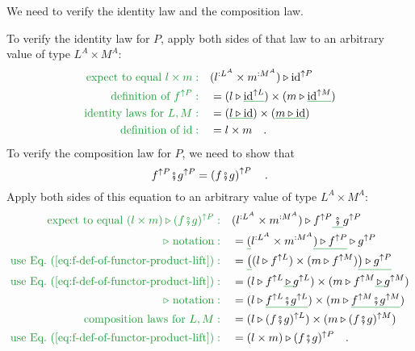 We need to verify the identity law and the composition law.

To verify the identity law for $P$, apply both sides of that law
to an arbitrary value of type $L^{A}\times M^{A}$:
\begin{align*}
{\color{greenunder}\text{expect to equal }l\times m:}\quad & (l^{:L^{A}}\times m^{:M^{A}})\triangleright\text{id}^{\uparrow P}\\
{\color{greenunder}\text{definition of }f^{\uparrow P}:}\quad & =(l\triangleright\gunderline{\text{id}^{\uparrow L}})\times(m\triangleright\gunderline{\text{id}^{\uparrow M}})\\
{\color{greenunder}\text{identity laws for }L,M:}\quad & =(\gunderline{l\triangleright\text{id}})\times(\gunderline{m\triangleright\text{id}})\\
{\color{greenunder}\text{definition of }\text{id}:}\quad & =l\times m\quad.
\end{align*}
To verify the composition law for $P$, we need to show that
\[
f^{\uparrow P}\bef g^{\uparrow P}=\left(f\bef g\right)^{\uparrow P}\quad.
\]
Apply both sides of this equation to an arbitrary value of type $L^{A}\times M^{A}$:
\begin{align*}
{\color{greenunder}\text{expect to equal }(l\times m)\triangleright(f\bef g)^{\uparrow P}:}\quad & (l^{:L^{A}}\times m^{:M^{A}})\triangleright f^{\uparrow P}\gunderline{\,\bef\,}g^{\uparrow P}\\
{\color{greenunder}\triangleright\text{ notation}:}\quad & =\gunderline (l^{:L^{A}}\times m^{:M^{A}}\gunderline{)\triangleright f^{\uparrow P}}\triangleright g^{\uparrow P}\\
{\color{greenunder}\text{use Eq.~(\ref{eq:f-def-of-functor-product-lift})}:}\quad & =\gunderline{\big(}(l\triangleright f^{\uparrow L})\times(m\triangleright f^{\uparrow M})\gunderline{\big)\triangleright g^{\uparrow P}}\\
{\color{greenunder}\text{use Eq.~(\ref{eq:f-def-of-functor-product-lift})}:}\quad & =(l\triangleright f^{\uparrow L}\gunderline{\,\triangleright\,}g^{\uparrow L})\times(m\triangleright f^{\uparrow M}\gunderline{\,\triangleright\,}g^{\uparrow M})\\
{\color{greenunder}\triangleright\text{ notation}:}\quad & =(l\triangleright\gunderline{f^{\uparrow L}\bef g^{\uparrow L}})\times(m\triangleright\gunderline{f^{\uparrow M}\bef g^{\uparrow M}})\\
{\color{greenunder}\text{composition laws for }L,M:}\quad & =(l\triangleright(f\bef g)^{\uparrow L})\times(m\triangleright(f\bef g)^{\uparrow M})\\
{\color{greenunder}\text{use Eq.~(\ref{eq:f-def-of-functor-product-lift})}:}\quad & =(l\times m)\triangleright(f\bef g)^{\uparrow P}\quad.
\end{align*}
